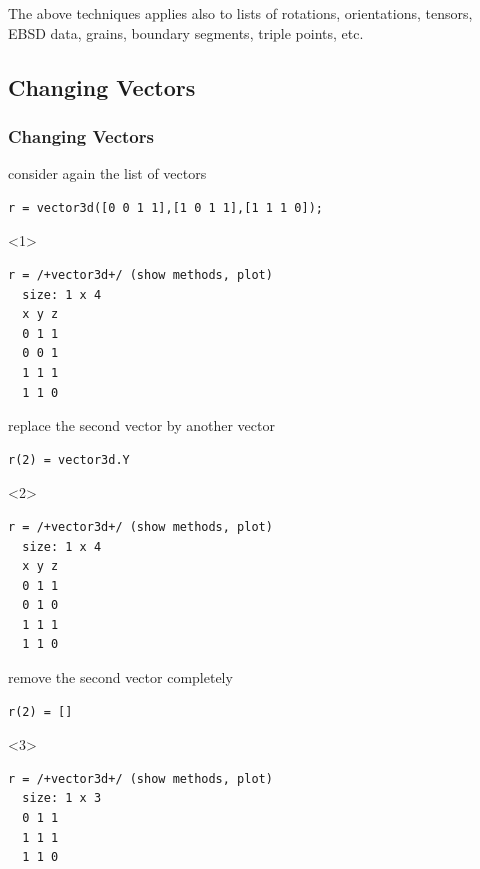 \documentclass[compress]{beamer}
\begin{document}
\begin{frame}[fragile]
\begin{overlayarea}{\textwidth}{8cm}
    \pause \medskip

    \alert{The above techniques applies also to lists of rotations,
      orientations, tensors, EBSD data, grains, boundary segments, triple
      points, etc.}
  \end{overlayarea}
\end{frame}


\subsection*{Changing Vectors}

\begin{frame}[fragile]
  \frametitle{Changing Vectors}

  \begin{overlayarea}{\textwidth}{8cm}

    consider again the list of vectors
    \begin{lstlisting}[style=input]
r = vector3d([0 0 1 1],[1 0 1 1],[1 1 1 0]);
    \end{lstlisting}

    \begin{onlyenv}<1>
      \vspace{-0.3cm}
      \begin{lstlisting}[style=output]
r = /+vector3d+/ (show methods, plot)
  size: 1 x 4
  x y z
  0 1 1
  0 0 1
  1 1 1
  1 1 0
      \end{lstlisting}
    \end{onlyenv}

    \pause \medskip

    replace the second vector by another vector
    \begin{lstlisting}[style=input]
r(2) = vector3d.Y
    \end{lstlisting}

    \begin{onlyenv}<2>
      \vspace{-0.3cm}
      \begin{lstlisting}[style=output]
r = /+vector3d+/ (show methods, plot)
  size: 1 x 4
  x y z
  0 1 1
  0 1 0
  1 1 1
  1 1 0
      \end{lstlisting}
    \end{onlyenv}

    \pause \medskip

    remove the second vector completely
    \begin{lstlisting}[style=input]
r(2) = []
    \end{lstlisting}
    \begin{onlyenv}<3>
      \vspace{-0.3cm}
      \begin{lstlisting}[style=output]
r = /+vector3d+/ (show methods, plot)
  size: 1 x 3
  0 1 1
  1 1 1
  1 1 0
      \end{lstlisting}
    \end{onlyenv}


\end{overlayarea}
\end{frame}
\end{document}

